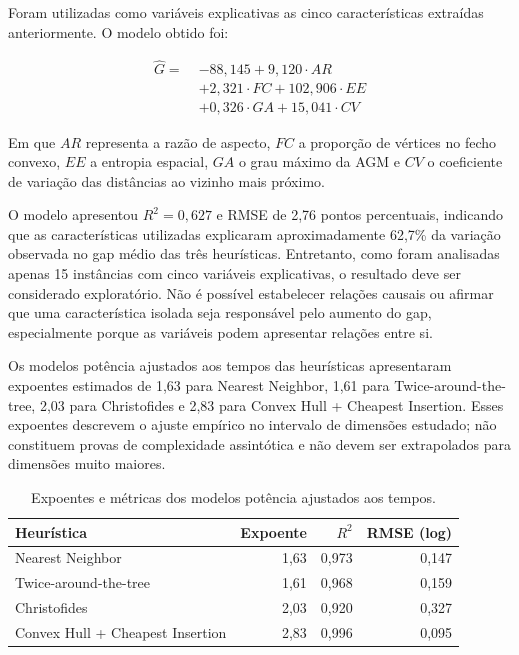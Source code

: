 \documentclass[12pt]{article}
\begin{document}
Foram utilizadas como variáveis explicativas as cinco características extraídas anteriormente. O modelo obtido foi:

\[
\begin{aligned}
\widehat{G} =\;& -88{,}145
+ 9{,}120 \cdot AR\\
&+ 2{,}321 \cdot FC
+ 102{,}906 \cdot EE\\
&+ 0{,}326 \cdot GA
+ 15{,}041 \cdot CV
\end{aligned}
\]

Em que $AR$ representa a razão de aspecto, $FC$ a proporção de vértices no fecho convexo, $EE$ a entropia espacial, $GA$ o grau máximo da AGM e $CV$ o coeficiente de variação das distâncias ao vizinho mais próximo.

O modelo apresentou $R^2 = 0{,}627$ e RMSE de 2,76 pontos percentuais, indicando que as características utilizadas explicaram aproximadamente 62,7\% da variação observada no gap médio das três heurísticas. Entretanto, como foram analisadas apenas 15 instâncias com cinco variáveis explicativas, o resultado deve ser considerado exploratório. Não é possível estabelecer relações causais ou afirmar que uma característica isolada seja responsável pelo aumento do gap, especialmente porque as variáveis podem apresentar relações entre si.

Os modelos potência ajustados aos tempos das heurísticas apresentaram expoentes estimados de 1,63 para Nearest Neighbor, 1,61 para Twice-around-the-tree, 2,03 para Christofides e 2,83 para Convex Hull + Cheapest Insertion. Esses expoentes descrevem o ajuste empírico no intervalo de dimensões estudado; não constituem provas de complexidade assintótica e não devem ser extrapolados para dimensões muito maiores.

\begin{table}[H]
\centering
\caption{Expoentes e métricas dos modelos potência ajustados aos tempos.}
\label{tab:expoentes}
\small
\begin{tabular}{lrrr}
\toprule
Heurística & Expoente & $R^2$ & RMSE (log)\\
\midrule
Nearest Neighbor & 1,63 & 0,973 & 0,147\\
Twice-around-the-tree & 1,61 & 0,968 & 0,159\\
Christofides & 2,03 & 0,920 & 0,327\\
Convex Hull + Cheapest Insertion & 2,83 & 0,996 & 0,095\\
\bottomrule
\end{tabular}
\end{table}
\end{document}
